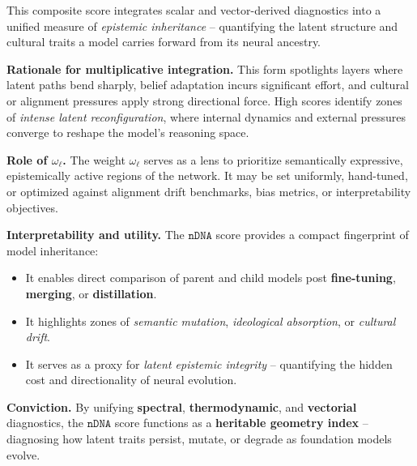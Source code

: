 \noindent
This composite score integrates scalar and vector-derived diagnostics into a unified measure of \emph{epistemic inheritance} -- quantifying the latent structure and cultural traits a model carries forward from its neural ancestry.

\vspace{0.3em}

\noindent
\textbf{Rationale for multiplicative integration.}  
This form spotlights layers where latent paths bend sharply, belief adaptation incurs significant effort, and cultural or alignment pressures apply strong directional force. 
High scores identify zones of \emph{intense latent reconfiguration}, where internal dynamics and external pressures converge to reshape the model’s reasoning space.


\vspace{0.3em}

\noindent
\textbf{Role of $\omega_\ell$.}  
The weight $\omega_\ell$ serves as a lens to prioritize semantically expressive, epistemically active regions of the network. It may be set uniformly, hand-tuned, or optimized against alignment drift benchmarks, bias metrics, or interpretability objectives.

\vspace{0.3em}

\noindent
\textbf{Interpretability and utility.}  
The $\texttt{nDNA}$ score provides a compact fingerprint of model inheritance:
\begin{itemize}[leftmargin=1.5em]
    \item It enables direct comparison of parent and child models post \textbf{fine-tuning}, \textbf{merging}, or \textbf{distillation}.
    \item It highlights zones of \emph{semantic mutation}, \emph{ideological absorption}, or \emph{cultural drift}.
    \item It serves as a proxy for \emph{latent epistemic integrity} -- quantifying the hidden cost and directionality of neural evolution.
\end{itemize}

\vspace{0.3em}

\noindent
\textbf{Conviction.}  
By unifying \textbf{spectral}, \textbf{thermodynamic}, and \textbf{vectorial} diagnostics, the $\texttt{nDNA}$ score functions as a \textbf{heritable geometry index} -- diagnosing how latent traits persist, mutate, or degrade as foundation models evolve.



